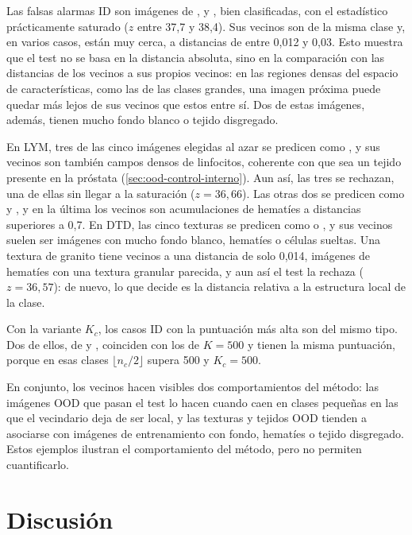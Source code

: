 Las falsas alarmas ID son imágenes de ,  y , bien clasificadas, con el estadístico prácticamente saturado ($z$ entre 37,7 y 38,4). Sus vecinos son de la misma clase y, en varios casos, están muy cerca, a distancias de entre 0,012 y 0,03. Esto muestra que el test no se basa en la distancia absoluta, sino en la comparación con las distancias de los vecinos a sus propios vecinos: en las regiones densas del espacio de características, como las de las clases grandes, una imagen próxima puede quedar más lejos de sus vecinos que estos entre sí. Dos de estas imágenes, además, tienen mucho fondo blanco o tejido disgregado.

En LYM, tres de las cinco imágenes elegidas al azar se predicen como , y sus vecinos son también campos densos de linfocitos, coherente con que sea un tejido presente en la próstata (\cref{sec:ood-control-interno}). Aun así, las tres se rechazan, una de ellas sin llegar a la saturación ($z = 36{,}66$). Las otras dos se predicen como  y , y en la última los vecinos son acumulaciones de hematíes a distancias superiores a 0,7. En DTD, las cinco texturas se predicen como  o , y sus vecinos suelen ser imágenes con mucho fondo blanco, hematíes o células sueltas. Una textura de granito tiene vecinos a una distancia de solo 0,014, imágenes de hematíes con una textura granular parecida, y aun así el test la rechaza ($z = 36{,}57$): de nuevo, lo que decide es la distancia relativa a la estructura local de la clase.

Con la variante $K_c$, los casos ID con la puntuación más alta son del mismo tipo. Dos de ellos, de  y , coinciden con los de $K = 500$ y tienen la misma puntuación, porque en esas clases $\lfloor n_c/2 \rfloor$ supera 500 y $K_c = 500$.

En conjunto, los vecinos hacen visibles dos comportamientos del método: las imágenes OOD que pasan el test lo hacen cuando caen en clases pequeñas en las que el vecindario deja de ser local, y las texturas y tejidos OOD tienden a asociarse con imágenes de entrenamiento con fondo, hematíes o tejido disgregado. Estos ejemplos ilustran el comportamiento del método, pero no permiten cuantificarlo.

\section{Discusión}\label{sec:stoodx-discusion}

